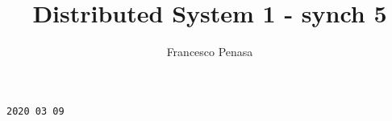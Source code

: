 \documentclass[11pt]{article}
\begin{document}
\author{Francesco Penasa}
\title{Distributed System 1 - synch 5}
\maketitle

\medskip

\texttt{2020 03 09}
\end{document}
